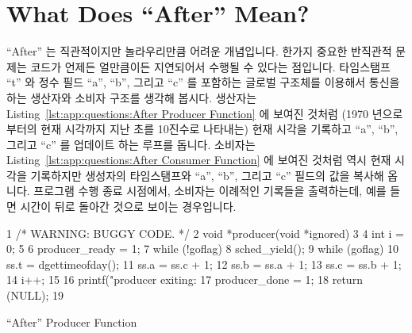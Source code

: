 
\section{What Does ``After'' Mean?}
\label{sec:app:questions:What Does ``After'' Mean?}

``After'' 는 직관적이지만 놀라우리만큼 어려운 개념입니다.
한가지 중요한 반직관적 문제는 코드가 언제든 얼만큼이든 지연되어서 수행될 수
있다는 점입니다.
타임스탬프 ``t'' 와 정수 필드 ``a'', ``b'', 그리고 ``c'' 를 포함하는 글로벌
구조체를 이용해서 통신을 하는 생산자와 소비자 구조를 생각해 봅시다.
생산자는
Listing~\ref{lst:app:questions:After Producer Function} 에 보여진 것처럼
(1970 년으로부터의 현재 시각까지 지난 초를 10진수로 나타내는) 현재 시각을
기록하고 ``a'', ``b'', 그리고 ``c'' 를 업데이트 하는 루프를 돕니다.
소비자는
Listing~\ref{lst:app:questions:After Consumer Function} 에 보여진 것처럼 역시
현재 시각을 기록하지만 생성자의 타임스탬프와 ``a'', ``b'', 그리고 ``c'' 필드의
값을 복사해 옵니다.
프로그램 수행 종료 시점에서, 소비자는 이례적인 기록들을 출력하는데, 예를 들면
시간이 뒤로 돌아간 것으로 보이는 경우입니다.
\iffalse

``After'' is an intuitive, but surprisingly difficult concept.
An important non-intuitive issue is that code can be delayed at
any point for any amount of time.
Consider a producing and a consuming thread that communicate using
a global struct with a timestamp ``t'' and integer fields ``a'', ``b'',
and ``c''.
The producer loops recording the current time
(in seconds since 1970 in decimal),
then updating the values of ``a'', ``b'', and ``c'',
as shown in Listing~\ref{lst:app:questions:After Producer Function}.
The consumer code loops, also recording the current time, but also
copying the producer's timestamp along with the fields ``a'',
``b'', and ``c'', as shown in
Listing~\ref{lst:app:questions:After Consumer Function}.
At the end of the run, the consumer outputs a list of anomalous recordings,
e.g., where time has appeared to go backwards.
\fi

\begin{listing}[htbp]
{ \scriptsize
\begin{verbbox}
  1 /* WARNING: BUGGY CODE. */
  2 void *producer(void *ignored)
  3 {
  4   int i = 0;
  5
  6   producer_ready = 1;
  7   while (!goflag)
  8     sched_yield();
  9   while (goflag) {
 10     ss.t = dgettimeofday();
 11     ss.a = ss.c + 1;
 12     ss.b = ss.a + 1;
 13     ss.c = ss.b + 1;
 14     i++;
 15   }
 16   printf("producer exiting: %
 17   producer_done = 1;
 18   return (NULL);
 19 }
\end{verbbox}
}
\centering
\theverbbox
\caption{``After'' Producer Function}
\label{lst:app:questions:After Producer Function}
\end{listing}

